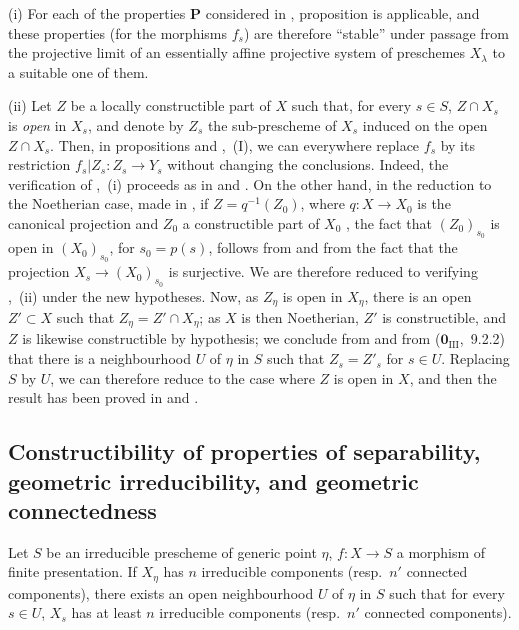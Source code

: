 \begin{remarks}[9.6.7]
\label{IV.9.6.7}
(i) For each of the properties $\mathbf{P}$ considered in , proposition  is applicable, and these properties (for the morphisms $f_s$) are therefore ``stable'' under passage from the projective limit of an essentially affine projective system  of preschemes $X_\lambda$ to a suitable one of them.

(ii) Let $Z$ be a locally constructible part of $X$ such that, for every $s\in S$, $Z\cap X_s$ is \emph{open} in $X_s$, and denote by $Z_s$ the sub-prescheme of $X_s$ induced on the open $Z\cap X_s$.
Then, in propositions  and ,~(I), we can everywhere replace $f_s$ by its restriction $f_s|Z_s:Z_s\to Y_s$ without changing the conclusions.
Indeed, the verification of ,~(i) proceeds as in  and .
On the other hand, in the reduction to the Noetherian case, made in , if $Z=q^{-1}(Z_0)$, where $q:X\to X_0$ is the canonical projection and $Z_0$ a constructible part of $X_0$ , the fact that $(Z_0)_{s_0}$ is open in $(X_0)_{s_0}$, for $s_0=p(s)$, follows from  and from the fact that the projection $X_s\to(X_0)_{s_0}$ is surjective.
We are therefore reduced to verifying ,~(ii) under the new hypotheses.
Now, as $Z_\eta$ is open in $X_\eta$, there is an open $Z'\subset X$ such that $Z_\eta=Z'\cap X_\eta$; as $X$ is then Noetherian, $Z'$ is constructible, and $Z$ is likewise constructible by hypothesis; we conclude from  and from ($\mathbf{0}_{\mathrm{III}}$,~9.2.2) that there is a neighbourhood $U$ of $\eta$ in $S$ such that $Z_s=Z'_s$ for $s\in U$.
Replacing $S$ by $U$, we can therefore reduce to the case where $Z$ is open in $X$, and then the result has been proved in  and .
\end{remarks}

\subsection{Constructibility of properties of separability, geometric irreducibility, and geometric connectedness}
\label{subsection:IV.9.7}
\label{IV.9.7}

\begin{lemma}[9.7.1]
\label{IV.9.7.1}
Let $S$ be an irreducible prescheme of generic point $\eta$, $f:X\to S$ a morphism of finite presentation.
If $X_\eta$ has $n$ irreducible components (resp.\ $n'$ connected components), there exists an open neighbourhood $U$ of $\eta$ in $S$ such that for every $s\in U$, $X_s$ has at least $n$ irreducible components (resp.\ $n'$ connected components).
\end{lemma}

